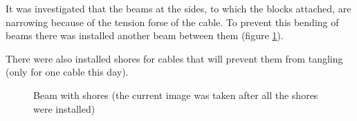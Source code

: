 It was investigated that the beams at the sides, to which the blocks attached, are narrowing because of the tension forse of the cable. To prevent this bending of beams there was installed another beam between them (figure \ref{Winch2.8}).

There were also installed shores for cables that will prevent them from tangling (only for one cable this day).

\begin{figure}[H]
	\begin{minipage}[h]{1\linewidth}
		\caption{Beam with shores (the current image was taken after all the shores were installed)}
		\label{Winch2.8}
	\end{minipage}
\end{figure}
